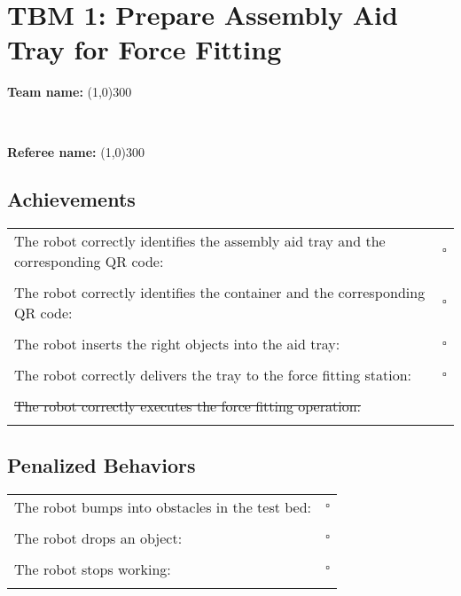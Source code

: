 \section*{TBM 1: Prepare Assembly Aid Tray for Force Fitting}
\vspace{0.5cm} \begin{large} \textbf{Team name:} \line(1,0){300} \end{large} \vspace{0.7cm} \\ 
\vspace{0.5cm} \begin{large} \textbf{Referee name:} \line(1,0){300} \end{large} \vspace{0.2cm}

\subsection*{Achievements}
\begin{tabular}{ l c}
The robot correctly identifies the assembly aid tray and the corresponding QR code: & $\square$ \\ \\
The robot correctly identifies the container and the corresponding QR code: & $\square$ \\ \\
The robot inserts the right objects into the aid tray: & $\square$ \\ \\
The robot correctly delivers the tray to the force fitting station: & $\square$ \\ \\
\st{The robot correctly executes the force fitting operation:} &  \\ \\
\end{tabular}

\subsection*{Penalized Behaviors}
\begin{tabular}{ l c}
The robot bumps into obstacles in the test bed: & $\square$ \\ \\
The robot drops an object: & $\square$ \\ \\
The robot stops working: & $\square$ \\ \\
\end{tabular}

